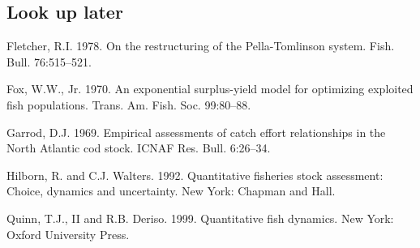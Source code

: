 \documentclass[fleqn]{article}
\begin{document}
\subsection{Look up later}
\small\sloppy\frenchspacing\setlength{\hyphenpenalty}{1000}
\begin{description}
  \item Fletcher, R.I. 1978. On the restructuring of the Pella-Tomlinson system.
  Fish. Bull. 76:515--521.

  \item Fox, W.W., Jr. 1970. An exponential surplus-yield model for optimizing
  exploited fish populations. Trans. Am. Fish. Soc. 99:80--88.

  \item Garrod, D.J. 1969. Empirical assessments of catch effort relationships
  in the North Atlantic cod stock. ICNAF Res. Bull. 6:26--34.

  \item Hilborn, R. and C.J. Walters. 1992. Quantitative fisheries stock
  assessment: Choice, dynamics and uncertainty. New York: Chapman and Hall.

  \item Quinn, T.J., II and R.B. Deriso. 1999. Quantitative fish dynamics. New
  York: Oxford University Press.
\end{description}
\end{document}

